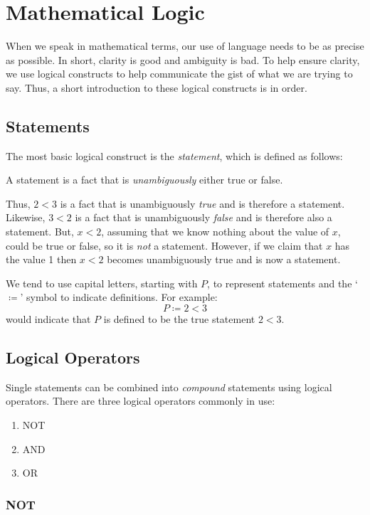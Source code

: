\documentclass[letterpaper,12pt,fleqn]{article}
\begin{document}
\section*{Mathematical Logic}

When we speak in mathematical terms, our use of language needs to be as precise
as possible. In short, clarity is good and ambiguity is bad. To help ensure
clarity, we use logical constructs to help communicate the gist of what we are
trying to say. Thus, a short introduction to these logical constructs is in
order.

\subsection*{Statements}

The most basic logical construct is the \emph{statement}, which is defined as
follows:

\begin{definition}[Statement]
A statement is a fact that is \emph{unambiguously} either true or false.
\end{definition}

Thus, $2<3$ is a fact that is unambiguously \emph{true} and is therefore a
statement.  Likewise, $3<2$ is a fact that is unambiguously \emph{false} and is
therefore also a statement. But, $x<2$, assuming that we know nothing about the
value of $x$, could be true or false, so it is \emph{not} a statement. However,
if we claim that $x$ has the value 1 then $x<2$ becomes unambiguously true and
is now a statement.

We tend to use capital letters, starting with $P$, to represent statements and
the `$\coloneqq$' symbol to indicate definitions.  For example:
\[P\coloneqq2<3\]
would indicate that $P$ is defined to be the true statement $2<3$.

\subsection*{Logical Operators}

Single statements can be combined into \emph{compound} statements using logical
operators. There are three logical operators commonly in use:
\begin{enumerate}
\item NOT
\item AND
\item OR
\end{enumerate}

\subsubsection*{NOT}
\end{document}
